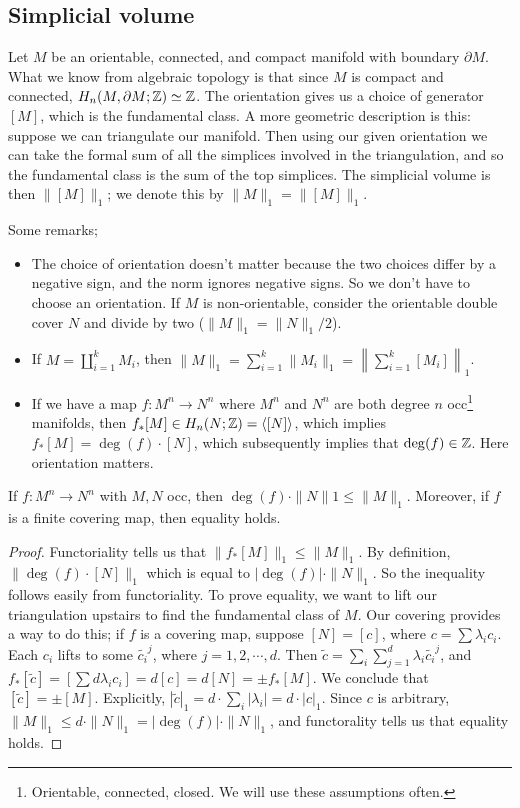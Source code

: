 \subsection{Simplicial volume}
Let $M$ be an orientable, connected, and compact manifold with boundary $\partial M$. What we know from algebraic topology is that since $M$ is compact and connected, $H_n (M ,\partial M ;\mathbb{Z}) \simeq  \mathbb{Z}$. The orientation gives us a choice of generator $[M]$, which is the fundamental class. A more geometric description is this: suppose we can triangulate our manifold. Then using our given orientation we can take the formal sum of all the simplices involved in the triangulation, and so the fundamental class is the sum of the top simplices. The simplicial volume is then $\| [M]\|_1$;  we denote this by $\|M\|_1= \| [M]\|_1$.

\begin{remark}
    Some remarks;
    \begin{itemize}
    \setlength\itemsep{-.2em}
\item The choice of orientation doesn't matter because the two choices differ by a negative sign, and the norm ignores negative signs. So we don't have to choose an orientation. If $M$ is non-orientable, consider the orientable double cover $N$ and divide by two ($\| M\|_1= \| N\|_1 /2 $).
\item If $M= \amalg _{i=1}^k M_i $, then $\|M\|_1= \sum_{i=1}^{k} \|M_i \|_1= \left\| \sum_{i=1}^{k} [M_i ]\right\|_1$.
\item If we have a map $f \colon M^n  \to N^n $ where $M^n $ and $N^n $ are both degree $n$ occ\footnote{Orientable, connected, closed. We will use these assumptions often.} manifolds, then $f_*[M] \in H_n (N; \mathbb{Z})=\langle [N] \rangle $, which implies $f_*[M]=\deg (f) \cdot [N]$, which subsequently implies that $\deg (f) \in \mathbb{Z}$. Here orientation matters.
    \end{itemize}
\end{remark}
\begin{lemma}
    If $f \colon M^n  \to N^n $ with $M,N$ occ, then $\deg (f) \cdot \|N\|1 \leq \|M\|_1$. Moreover, if $f$ is a finite covering map, then equality holds.
\end{lemma}
\begin{proof}
    Functoriality tells us that $\|f_* [M]\|_1 \leq \|M\|_1$. By definition, $\| \deg (f) \cdot [N]\|_1$ which is equal to $|\deg (f)| \cdot \|N\|_1$. So the inequality follows easily from functoriality. To prove equality, we want to lift our triangulation upstairs to find the fundamental class of $M$. Our covering provides a way to do this; if $f$ is a covering map, suppose $[N]=[c]$, where $c= \sum \lambda_i c_i $. Each $c_i $ lifts to some $\widetilde {c_i }^j  $, where $j=1,2,\cdots ,d.$ Then $\widetilde c= \sum _i  \sum _{j=1}^d \lambda_i  \widetilde{c_i } ^j $, and $f_*[\widetilde c]=\left[\sum d \lambda_i c_i\right]=d[c]=d[N]=\pm f_*[M] $. We conclude that $[\widetilde c]=\pm [M]$. Explicitly, $| \widetilde c|_1=d \cdot \sum _i |\lambda_i |=d \cdot |c|_1$. Since $c$ is arbitrary, $\| M\|_1 \leq d \cdot \| N\|_1=|\deg (f) |\cdot \|N\|_1$, and functorality tells us that equality holds.
\end{proof}

